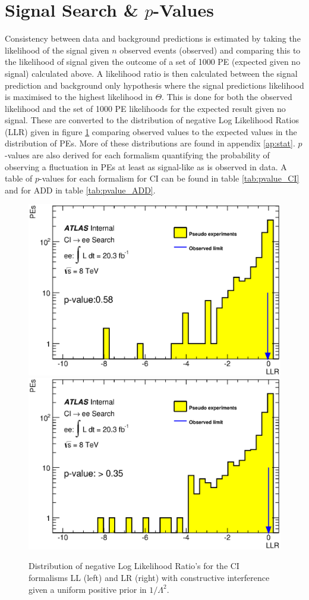 \section{Signal Search \& $p$-Values}

    Consistency between data and background predictions is estimated by taking the likelihood of the signal given $n$ observed events (observed) and comparing this to the likelihood of signal given the outcome of a set of 1000 PE (expected given no signal) calculated above. A likelihood ratio is then calculated between the signal prediction and background only hypothesis where the signal predictions likelihood is maximised to the highest likelihood in $\Theta$. This is done for both the observed likelihood and the set of 1000 PE likelihoods for the expected result given no signal. These are converted to the distribution of negative Log Likelihood Ratios (LLR) given in figure \ref{fig:LLR_CI_main} comparing observed values to the expected values in the distribution of PEs. More of these distributions are found in appendix \ref{ap:stat}. $p$-values are also derived for each formalism quantifying the probability of observing a fluctuation in PEs at least as signal-like as is observed in data. A table of $p$-values for each formalism for CI can be found in table \ref{tab:pvalue_CI} and for ADD in table \ref{tab:pvalue_ADD}. 



    \begin{figure}[h]
        \begin{center}
            \includegraphics[width=0.49\linewidth]{images/ee__LL_minus_L2/LLR.eps}
            \includegraphics[width=0.49\linewidth]{images/ee__LR_minus_L2/LLR.eps}
        \end{center}
       \caption{Distribution of negative Log Likelihood Ratio's for the CI formalisms LL (left) and LR (right) with constructive interference given a uniform positive prior in $1/\Lambda^{2}$.}
       \label{fig:LLR_CI_main}
    \end{figure}

